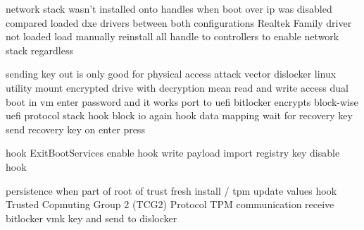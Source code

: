 network stack wasn't installed onto handles when boot over ip was disabled
compared loaded dxe drivers between both configurations
Realtek Family driver not loaded
load manually
reinstall all handle to controllers to enable network stack regardless

sending key out is only good for physical access attack vector
dislocker linux utility
mount encrypted drive with decryption mean
read and write access
dual boot in vm
enter password and it works
port to uefi
bitlocker encrypts block-wise
uefi protocol stack
hook block io
again hook data mapping
wait for recovery key
send recovery key on enter press

hook ExitBootServices
enable hook
write payload
import registry key
disable hook

persistence when part of root of trust
fresh install / tpm update values
hook Trusted Copmuting Group 2 (TCG2) Protocol
TPM communication
receive bitlocker vmk key and send to dislocker


